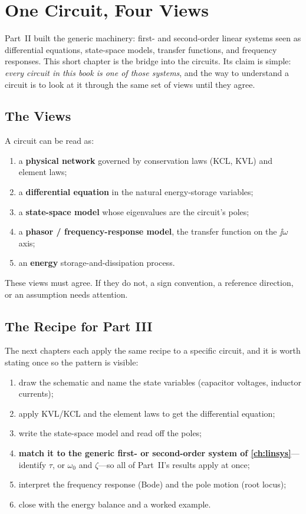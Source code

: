 \chapter{One Circuit, Four Views}
\label{ch:fourviews}
Part~II built the generic machinery: first- and second-order linear systems seen
as differential equations, state-space models, transfer functions, and frequency
responses. This short chapter is the bridge into the circuits. Its claim is
simple: \emph{every circuit in this book is one of those systems}, and the way to
understand a circuit is to look at it through the same set of views until they
agree.

\section{The Views}
A circuit can be read as:
\begin{enumerate}
\item a \textbf{physical network} governed by conservation laws (KCL, KVL) and
element laws;
\item a \textbf{differential equation} in the natural energy-storage variables;
\item a \textbf{state-space model} whose eigenvalues are the circuit's poles;
\item a \textbf{phasor / frequency-response model}, the transfer function on the
\(\jj\omega\) axis;
\item an \textbf{energy} storage-and-dissipation process.
\end{enumerate}
These views must agree. If they do not, a sign convention, a reference direction,
or an assumption needs attention.

\section{The Recipe for Part III}
The next chapters each apply the same recipe to a specific circuit, and it is
worth stating once so the pattern is visible:
\begin{enumerate}
\item draw the schematic and name the state variables (capacitor voltages,
inductor currents);
\item apply KVL/KCL and the element laws to get the differential equation;
\item write the state-space model and read off the poles;
\item \textbf{match it to the generic first- or second-order system of
\cref{ch:linsys}}---identify \(\tau\), or \(\omega_0\) and \(\zeta\)---so all of
Part~II's results apply at once;
\item interpret the frequency response (Bode) and the pole motion (root locus);
\item close with the energy balance and a worked example.
\end{enumerate}

